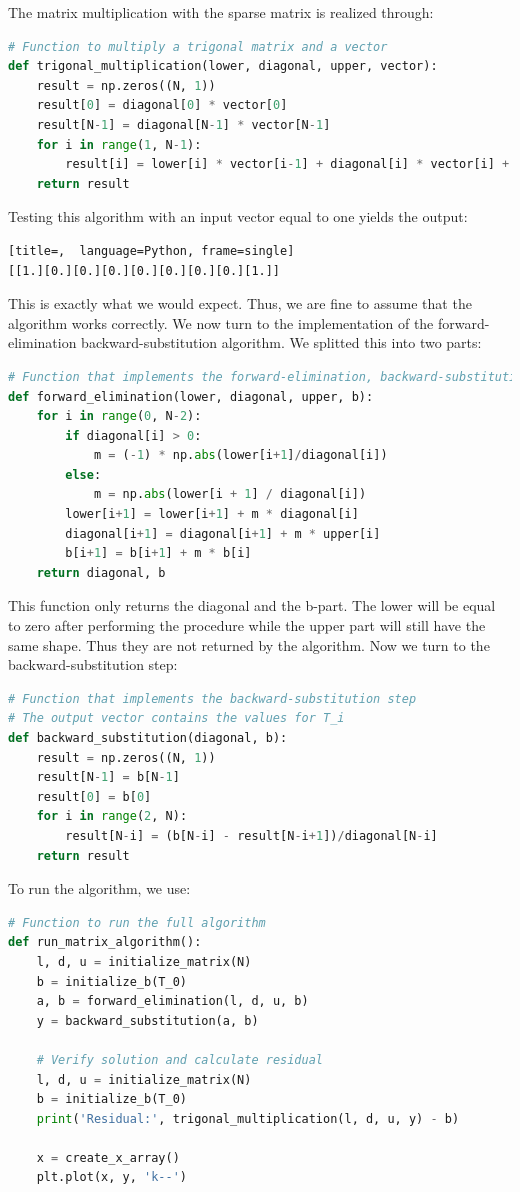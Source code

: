 \documentclass{scrartcl}
\begin{document}
The matrix multiplication with the sparse matrix is realized through:
\begin{lstlisting}[title=Function to multiply the given sparse matrix with a vector.,  language=Python, frame=single]
# Function to multiply a trigonal matrix and a vector
def trigonal_multiplication(lower, diagonal, upper, vector):
	result = np.zeros((N, 1))
	result[0] = diagonal[0] * vector[0]
	result[N-1] = diagonal[N-1] * vector[N-1]
	for i in range(1, N-1):
		result[i] = lower[i] * vector[i-1] + diagonal[i] * vector[i] + upper[i] * vector[i+1]
	return result
\end{lstlisting}
Testing this algorithm with an input vector equal to one yields the output:
\begin{lstlisting}[title=,  language=Python, frame=single]
[[1.][0.][0.][0.][0.][0.][0.][0.][1.]]
\end{lstlisting}
This is exactly what we would expect. Thus, we are fine to assume that the algorithm works correctly.
We now turn to the implementation of the forward-elimination backward-substitution algorithm. We splitted this into two parts:
\begin{lstlisting}[title=Function for the forward elimination step.,  language=Python, frame=single]
# Function that implements the forward-elimination, backward-substitution algorithm
def forward_elimination(lower, diagonal, upper, b):
	for i in range(0, N-2):
		if diagonal[i] > 0:
			m = (-1) * np.abs(lower[i+1]/diagonal[i])
		else:
			m = np.abs(lower[i + 1] / diagonal[i])
		lower[i+1] = lower[i+1] + m * diagonal[i]
		diagonal[i+1] = diagonal[i+1] + m * upper[i]
		b[i+1] = b[i+1] + m * b[i]
	return diagonal, b
\end{lstlisting}
This function only returns the diagonal and the b-part. The lower will  be equal to zero after performing the procedure while the upper part will still have the same shape. Thus they are not returned by the algorithm.
Now we turn to the backward-substitution step:
\begin{lstlisting}[title=Function for the backward substitution step.,  language=Python, frame=single]
# Function that implements the backward-substitution step
# The output vector contains the values for T_i
def backward_substitution(diagonal, b):
	result = np.zeros((N, 1))
	result[N-1] = b[N-1]
	result[0] = b[0]
	for i in range(2, N):
		result[N-i] = (b[N-i] - result[N-i+1])/diagonal[N-i]
	return result
\end{lstlisting}
To run the algorithm, we use:
\begin{lstlisting}[title=Runs the forward-backward algorithm and plots the result and also calculates the residual.,  language=Python, frame=single]
# Function to run the full algorithm
def run_matrix_algorithm():
	l, d, u = initialize_matrix(N)
	b = initialize_b(T_0)
	a, b = forward_elimination(l, d, u, b)
	y = backward_substitution(a, b)
	
	# Verify solution and calculate residual
	l, d, u = initialize_matrix(N)
	b = initialize_b(T_0)
	print('Residual:', trigonal_multiplication(l, d, u, y) - b)
	
	x = create_x_array()
	plt.plot(x, y, 'k--')
\end{lstlisting}
\end{document}
